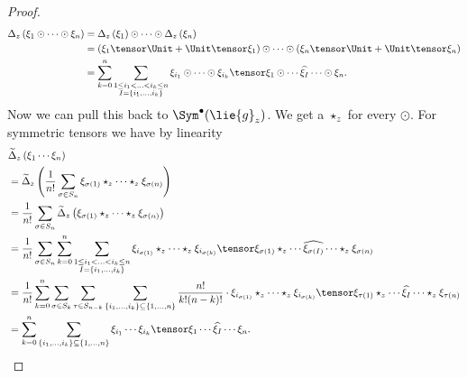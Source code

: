\begin{proof}
\begin{align*}
		\ocoproduct_z \left(
			\xi_1 \odot \cdots \odot \xi_n
		\right)
		& =
		\ocoproduct_z \left( \xi_1 \right)
		\odot \cdots \odot
		\ocoproduct_z \left( \xi_n \right)
		\\
		&=
		\left( \xi_1 \tensor \Unit + \Unit \tensor \xi_1 \right)
		\odot \cdots \odot
		\left( \xi_n \tensor \Unit + \Unit \tensor \xi_n \right)
		\\
		&=
		\sum\limits_{k=0}^n
		\sum\limits_{\substack{
			1 \leq i_1
			< \ldots <
			i_k \leq n
			\\
			I = \{i_1, \ldots, i_k\}
		}}
		\xi_{i_1} \odot \cdots \odot \xi_{i_k}
		\tensor
		\xi_1 
		\odot \cdots 
		\widehat{\xi_I}
		\cdots \odot
		\xi_n.
	\end{align*}
	Now we can pull this back to $\Sym^{\bullet}(\lie{g}_z)$. We get a $\star_z$ 
	for every $\odot$. For symmetric tensors we have by linearity
	\begin{align*}
		&
		\widetilde{\ocoproduct}_z 
		\left( \xi_1 \cdots \xi_n \right)
		\\
		& =
		\widetilde{\ocoproduct}_z \left( 
			\frac{1}{n!}
			\sum\limits_{\sigma \in S_n}
			\xi_{\sigma(1)} 
			\star_z \cdots \star_z 
			\xi_{\sigma(n)}
		\right)
		\\
		& =
		\frac{1}{n!}
		\sum\limits_{\sigma \in S_n}
		\widetilde{\ocoproduct}_z \left( 
			\xi_{\sigma(1)} 
			\star_z \cdots \star_z 
			\xi_{\sigma(n)}
		\right)
		\\
		& =
		\frac{1}{n!}
		\sum\limits_{\sigma \in S_n}
		\sum\limits_{k=0}^n
		\sum\limits_{\substack{
			1 \leq i_1
			< \ldots <
			i_k \leq n
			\\
			I = \{i_1, \ldots, i_k\}
		}}
		\xi_{i_{\sigma(1)}} 
		\star_z \cdots \star_z
		\xi_{i_{\sigma(k)}}
		\tensor
		\xi_{\sigma(1)}
		\star_z \cdots
		\widehat{\xi_{\sigma(I)}}
		\cdots \star_z 
		\xi_{\sigma(n)}
		\\
		& =
		\frac{1}{n!}
		\sum\limits_{k=0}^n
		\sum\limits_{\sigma \in S_k}
		\sum\limits_{\tau \in S_{n - k}}
		\sum\limits_{
			\{i_1, \ldots, i_k\}
			\subseteq
			\{1, \ldots, n\}
		}
		\frac{n!}{k! (n - k)!}
		\cdot
		\xi_{i_{\sigma(1)}} 
		\star_z \cdots \star_z 
		\xi_{i_{\sigma(k)}}
		\tensor
		\xi_{\tau(1)}
		\star_z \cdots 
		\widehat{\xi_I}
		\cdots \star_z 
		\xi_{\tau(n)}
		\\
		& =
		\sum\limits_{k=0}^n
		\sum\limits_{
			\{i_1, \ldots, i_k\}
			\subseteq
			\{1, \ldots, n\}
		}
		\xi_{i_1} \cdots \xi_{i_k}
		\tensor
		\xi_1 \cdots \widehat{\xi_I} \cdots \xi_n.
	\end{align*}
\end{proof}

